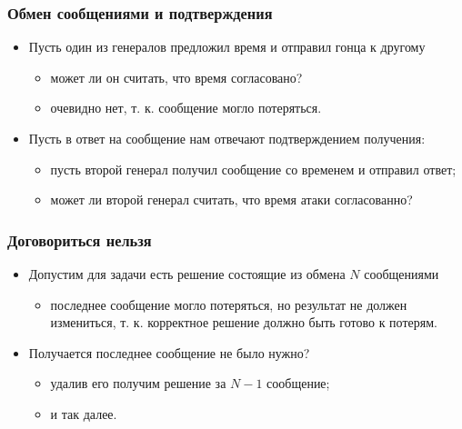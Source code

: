 \begin{frame}
\frametitle{Обмен сообщениями и подтверждения}
\begin{itemize}
  \item Пусть один из генералов предложил время и отправил гонца к другому
  \begin{itemize}
    \item может ли он считать, что время согласовано?
    \item очевидно нет, т. к. сообщение могло потеряться.
  \end{itemize}
  \item Пусть в ответ на сообщение нам отвечают подтверждением получения:
  \begin{itemize}
    \item пусть второй генерал получил сообщение со временем и отправил ответ;
    \item может ли второй генерал считать, что время атаки согласованно?
  \end{itemize}
\end{itemize}
\end{frame}

\begin{frame}
\frametitle{Договориться нельзя}
\begin{itemize}
  \item Допустим для задачи есть решение состоящие из обмена $N$ сообщениями
  \begin{itemize}
    \item последнее сообщение могло потеряться, но результат не должен
    измениться, т. к. корректное решение должно быть готово к потерям.
  \end{itemize}
  \item Получается последнее сообщение не было нужно?
  \begin{itemize}
    \item удалив его получим решение за $N - 1$ сообщение;
    \item и так далее.
  \end{itemize}
\end{itemize}
\end{frame}


